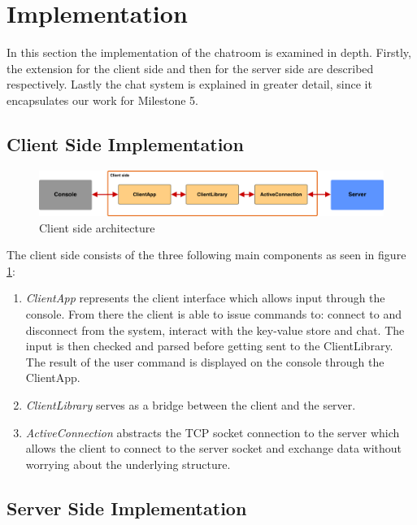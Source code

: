 \section{Implementation}
\label{sec:implementation}

In this section the implementation of the chatroom is examined in depth. Firstly, the extension for the client side and then for the server side are described respectively. Lastly the chat system is explained in greater detail, since it encapsulates our work for Milestone 5.

\subsection{Client Side Implementation}
\label{sec:Implementation_clintside}

\begin{figure}[h]
	\centering
	\includegraphics[width=\linewidth]{figures/client_arch.png}
	\caption{Client side architecture}
	\label{fig:client_arch}
\end{figure}
The client side consists of the three following main components as seen in figure \ref{fig:client_arch}:
\begin{enumerate} 
  \item \textit{ClientApp} represents the client interface which allows input through the console. From there the client is able to issue commands to: connect to and disconnect from the system, interact with the key-value store and chat. The input is then checked and parsed before getting sent to the ClientLibrary. The result of the user command is displayed on the console through the ClientApp.
  \item \textit{ClientLibrary} serves as a bridge between the client and the server.
  \item \textit{ActiveConnection} abstracts the TCP socket connection to the server which allows the client to connect to the server socket and exchange data without worrying about the underlying structure.
\end{enumerate}
 
\subsection{Server Side Implementation}
\label{sec:implementation_serverside}


